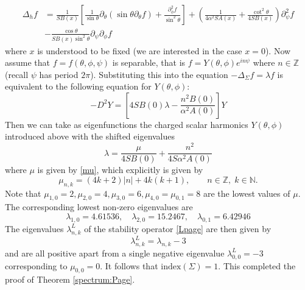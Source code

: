 \documentclass[11pt]{amsart}
\theoremstyle{plain}
\theoremstyle{definition}
\numberwithin{equation}{section}
\begin{document}
\begin{equation}
\begin{aligned}
    \Delta_h f & = \frac{1}{S B(x)} \left[ \frac{1}{\sin\theta} \partial_\theta ( \sin\theta \partial_\theta f) + \frac{\partial_\phi^2 f}{\sin^2\theta}  \right] + \left( \frac{1}{4\alpha^2 S A(x)} + \frac{\cot^2\theta}{4 S B(x)}\right)\partial_{\psi}^2 f \\
    & - \frac{\cos \theta}{S B(x) \sin^2\theta} \partial_\psi \partial_\phi f
\end{aligned}
\end{equation} where $x$ is understood to be fixed (we are interested in the case $x=0$). Now assume that $f = f(\theta, \phi, \psi)$ is separable, that is $f = Y(\theta,\phi) e^{i n \psi}$ where $n \in \mathbb{Z}$ (recall $\psi$ has period $2\pi$). Substituting this into the equation $-\Delta_\Sigma f =  \lambda f$ is equivalent to the following equation for $Y(\theta,\phi)$:
\begin{equation}
    -D^2 Y = \left[ 4 S B(0) \lambda - \frac{n^2 B(0)}{\alpha^2 A(0)}\right] Y
\end{equation} Then we can take as eigenfunctions the charged scalar harmonics $Y(\theta, \phi)$ introduced above with the shifted eigenvalues
\begin{equation}
    \lambda = \frac{\mu}{4S B(0)} + \frac{n^2}{4 S \alpha^2 A(0)}
\end{equation} where $\mu$ is given by \eqref{mu}, which explicitly is given by
\begin{equation}
    \mu_{n,k} = (4k + 2)|n| + 4k(k +1), \qquad n \in \mathbb{Z},\; k \in \mathbb{N}.
\end{equation} Note that $\mu_{1,0} = 2, \mu_{2,0} = 4, \mu_{3,0} = 6, \mu_{4,0} = \mu_{0,1} = 8$ are the lowest values of $\mu$. The corresponding lowest non-zero eigenvalues are
\begin{equation}
    \lambda_{1,0} =4.61536, \quad \lambda_{2,0} = 15.2467, \quad \lambda_{0,1} = 6.42946
\end{equation} The eigenvalues $\lambda^L_{n,k}$ of the stability operator \eqref{Lpage} are then given by 
\begin{equation}
    \lambda^L_{n,k} = \lambda_{n,k} - 3
\end{equation} and are all positive apart from a single negative eigenvalue $\lambda^L_{0,0} = -3$ corresponding to $\mu_{0,0} =0$. It follows that $\text{index}(\Sigma) = 1$. This completed the proof of Theorem \ref{spectrum:Page}.
\end{document}
